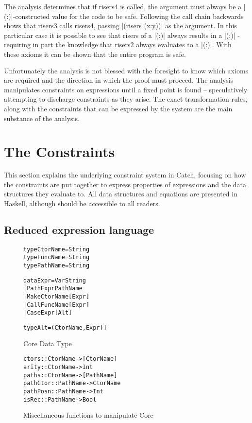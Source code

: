 \documentclass[preprint]{sigplanconf}
\newcommand{\C}[1]{\textsf{#1}}
\newenvironment{code}{\begin{alltt}\small}{\end{alltt}}
\begin{document}
The analysis determines that if \C{risers4} is called, the argument must always be a |(:)|-constructed value for the code to be safe. Following the call chain backwards shows that \C{risers3} calls \C{risers4}, passing |(risers (x:y))| as the argument. In this particular case it is possible to see that risers of a |(:)| always results in a |(:)| - requiring in part the knowledge that \C{risers2} always evaluates to a |(:)|. With these axioms it can be shown that the entire program is safe.

Unfortunately the analysis is not blessed with the foresight to know which axioms are required and the direction in which the proof must proceed. The analysis manipulates constraints on expressions until a fixed point is found -- speculatively attempting to discharge constraints as they arise. The exact transformation rules, along with the constraints that can be expressed by the system are the main substance of the analysis.


\section{The Constraints}
\label{sec:manipulate}

This section explains the underlying constraint system in Catch, focusing on how the constraints are put together to express properties of expressions and the data structures they evaluate to. All data structures and equations are presented in Haskell, although should be accessible to all readers.

\subsection{Reduced expression language}
\label{sec:core}

\begin{figure}
\begin{code}
type CtorName  =  String
type FuncName  =  String
type PathName  =  String

data Expr  =  Var String
           |  Path Expr PathName
           |  Make CtorName [Expr]
           |  Call FuncName [Expr]
           |  Case Expr [Alt]

type Alt = (CtorName, Expr)]
\end{code}
\caption{Core Data Type}
\label{fig:core}
\end{figure}

\begin{figure}
\begin{code}
ctors     :: CtorName  -> [CtorName]
arity     :: CtorName  -> Int
paths     :: CtorName  -> [PathName]
pathCtor  :: PathName  -> CtorName
pathPosn  :: PathName  -> Int
isRec     :: PathName  -> Bool
\end{code}
\caption{Miscellaneous functions to manipulate Core}
\end{figure}
\end{document}
